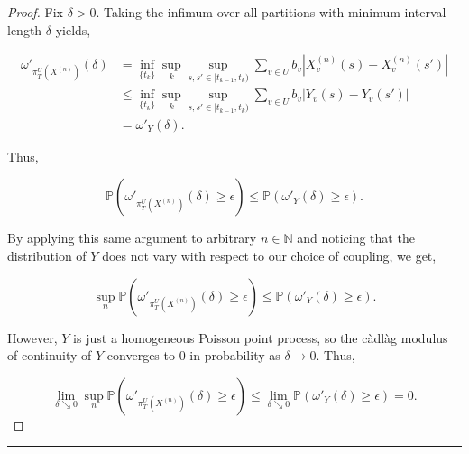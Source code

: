 \documentclass[12pt]{article}
\newcommand{\mb}{\mathbb}
\newcommand{\ra}{\rightarrow}
\newcommand{\ep}{\epsilon}
\newcommand{\lin}{\rule{\linewidth}{0.4 pt}}
\newcommand{\pr}{\mb{P}}							%
\renewcommand{\v}{v}							%
\renewcommand{\U}{U}							%
\renewcommand{\b}{b}							%
\newcommand{\T}{T}								%
\renewcommand{\t}{t}							%
\newcommand{\proj}{\pi}							%
\renewcommand{\tt}{s}							%
\newcommand{\ttt}{s'}							%
\newcommand{\X}{X}								%
\newcommand{\vsi}[1]{^{#1}}						%
\newcommand{\cind}[1]{_{#1}}					%
\newcommand{\tp}[1]{(#1)}						%
\newcommand{\ts}[1]{_{#1}}						%
\newcommand{\sln}[1]{^{(#1)}}					%
\newcommand{\indx}[1]{_{#1}}					%
\newcommand{\XX}{Y}								%
\renewcommand{\it}{k}							%
\begin{document}
\begin{proof}
Fix \(\delta > 0\). Taking the infimum over all partitions with minimum interval length \(\delta\) yields,

\begin{align*}
\omega'_{\proj\vsi{\U}\ts{\T}\left(\X\sln{n}\right)}(\delta) &= \inf_{\{\t\indx{\it}\}}\sup_\it\sup_{\tt,\ttt \in [\t\indx{\it-1},\t\indx{\it})} \sum_{\v\in \U} \b\cind{\v}|\X\sln{n}\cind{\v}\tp{\tt} - \X\sln{n}\cind{\v}\tp{\ttt}|\\
&\leq \inf_{\{\t\indx{\it}\}}\sup_\it\sup_{\tt,\ttt \in [\t\indx{\it-1},\t\indx{\it})} \sum_{\v\in \U} \b\cind{\v}|\XX\cind{\v}\tp{\tt} - \XX\cind{\v}\tp{\ttt}|\\
&= \omega'_{\XX}(\delta).
\end{align*}

Thus,

\[\pr\left(\omega'_{\proj\vsi{\U}\ts{\T}\left(\X\sln{n}\right)}(\delta) \geq \ep\right) \leq \pr\left(\omega'_{\XX}(\delta) \geq \ep\right).\]

By applying this same argument to arbitrary \(n\in \mb{N}\) and noticing that the distribution of \(\XX\) does not vary with respect to our choice of coupling, we get,

\[\sup_{n}\pr\left(\omega'_{\proj\vsi{\U}\ts{\T}\left(\X\sln{n}\right)}(\delta)\geq \ep\right) \leq \pr\left(\omega'_{\XX}(\delta) \geq \ep\right).\]

However, \(\XX\) is just a homogeneous Poisson point process, so the c\`adl\`ag modulus of continuity of \(\XX\) converges to 0 in probability as \(\delta \ra 0\). Thus,

\[\lim_{\delta \searrow 0}\sup_{n}\pr\left(\omega'_{\proj\vsi{\U}\ts{\T}\left(\X\sln{n}\right)}(\delta) \geq \ep\right) \leq \lim_{\delta\searrow 0}\pr\left(\omega'_{\XX}(\delta)\geq \ep\right) = 0.\]


\end{proof}

\lin
\end{document}
